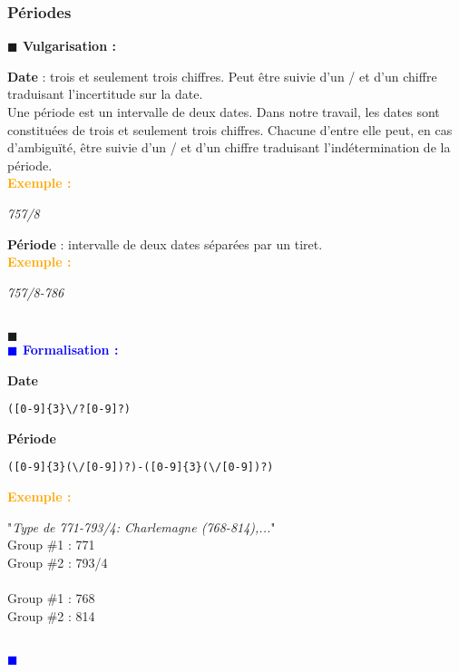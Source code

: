 \documentclass[a4paper, 11pt]{article}
\newenvironment{vulgarisation}
    {
    \textbf{\textcolor{dark-blue}{$\blacksquare$  Vulgarisation : \\}}

    }
    {
    ~\\\textcolor{dark-blue}{$\blacksquare$}\\
    }
\newenvironment{formalisation}
    {
    \textbf{\textcolor{blue}{$\blacksquare$  Formalisation : \\}}
    }
    {
    ~\\\textcolor{blue}{$\blacksquare$}\\
    }
\newenvironment{exemple}
    {
    \textbf{\textcolor{orange}{
    Exemple : \\}}
    }
    {\\
    }
\begin{document}
\subsubsection{Périodes}
\begin{vulgarisation}
\textbf{Date} : trois et seulement trois chiffres. Peut être suivie d'un \og/\fg{} et d'un chiffre traduisant l'incertitude sur la date.\\
Une période est un intervalle de deux dates. Dans notre travail, les dates sont constituées de trois et seulement trois chiffres. Chacune d'entre elle peut, en cas d’ambiguïté, être suivie d'un \og/\fg{} et d'un chiffre traduisant l'indétermination de la période.\\
\begin{exemple}
\textit{757/8}
\end{exemple}

\textbf{Période} : intervalle de deux dates séparées par un tiret.\\
\begin{exemple}
\textit{757/8-786}
\end{exemple}

\end{vulgarisation}
\begin{formalisation}
\textbf{Date}
\begin{verbatim}
([0-9]{3}\/?[0-9]?)
\end{verbatim}
\textbf{Période}
\begin{verbatim}
([0-9]{3}(\/[0-9])?)-([0-9]{3}(\/[0-9])?)
\end{verbatim}
\begin{exemple}
"\emph{Type de 771-793/4: Charlemagne (768-814),...}" \\
Group \#1 : 771 \\
Group \#2 : 793/4\\\\\noindent
Group \#1 : 768 \\
Group \#2 : 814
\end{exemple}
\end{formalisation}
\end{document}
